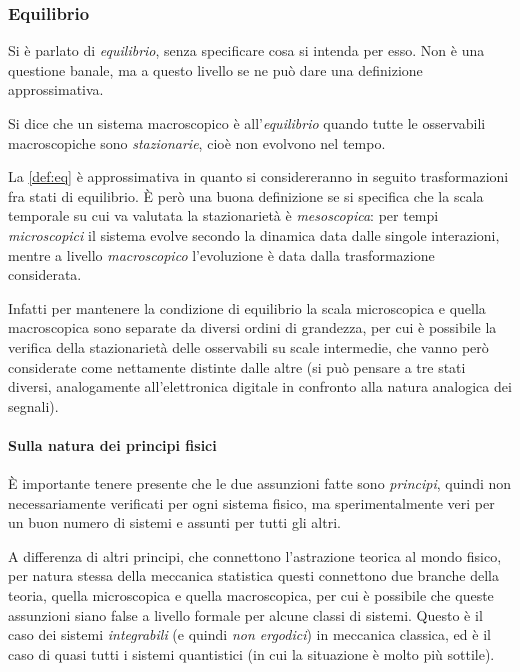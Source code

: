 \subsubsection{Equilibrio}

Si è parlato di \textit{equilibrio}, senza specificare cosa si intenda per esso. Non è una questione banale, ma a questo livello se ne può dare una definizione approssimativa.

\begin{defn}[Equilibrio]
	\label{def:eq}
	Si dice che un sistema macroscopico è all'\textit{equilibrio} quando tutte le osservabili macroscopiche sono \textit{stazionarie}, cioè non evolvono nel tempo.
\end{defn}

La \cref{def:eq} è approssimativa in quanto si considereranno in seguito trasformazioni fra stati di equilibrio.
\`E però una buona definizione se si specifica che la scala temporale su cui va valutata la stazionarietà è \textit{mesoscopica}: per tempi \textit{microscopici} il sistema evolve secondo la dinamica data dalle singole interazioni, mentre a livello \textit{macroscopico} l'evoluzione è data dalla trasformazione considerata.

Infatti per mantenere la condizione di equilibrio la scala microscopica e quella macroscopica sono separate da diversi ordini di grandezza, per cui è possibile la verifica della stazionarietà delle osservabili su scale intermedie, che vanno però considerate come nettamente distinte dalle altre (si può pensare a tre stati diversi, analogamente all'elettronica digitale in confronto alla natura analogica dei segnali).

\paragraph{Sulla natura dei principi fisici} \`E importante tenere presente che le due assunzioni fatte sono \textit{principi}, quindi non necessariamente verificati per ogni sistema fisico, ma sperimentalmente veri per un buon numero di sistemi e assunti per tutti gli altri.

A differenza di altri principi, che connettono l'astrazione teorica al mondo fisico, per natura stessa della meccanica statistica questi connettono due branche della teoria, quella microscopica e quella macroscopica, per cui è possibile che queste assunzioni siano false a livello formale per alcune classi di sistemi. Questo è il caso dei sistemi \textit{integrabili} (e quindi \textit{non ergodici}) in meccanica classica, ed è il caso di quasi tutti i sistemi quantistici (in cui la situazione è molto più sottile).

